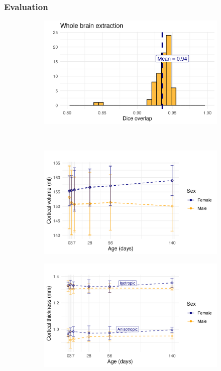 \documentclass[
  12pt,
]{article}
\begin{document}
\subsubsection{Evaluation}\label{evaluation}

\begin{figure}
\centering
\begin{subfigure}{0.5\textwidth}
  \centering
  \includegraphics[width=\linewidth]{Figures/diceWholeBrain.png}
  \caption{}
  \label{fig:suba}
\end{subfigure}\\
\begin{subfigure}{0.5\textwidth}
  \centering
  \includegraphics[width=\linewidth]{Figures/corticoPlot.png}
  \caption{}
  \label{fig:subb}
\end{subfigure}%
\begin{subfigure}{.5\textwidth}
  \centering
  \includegraphics[width=\linewidth]{Figures/kkPlot.png}

\end{subfigure}
\end{figure}
\end{document}

